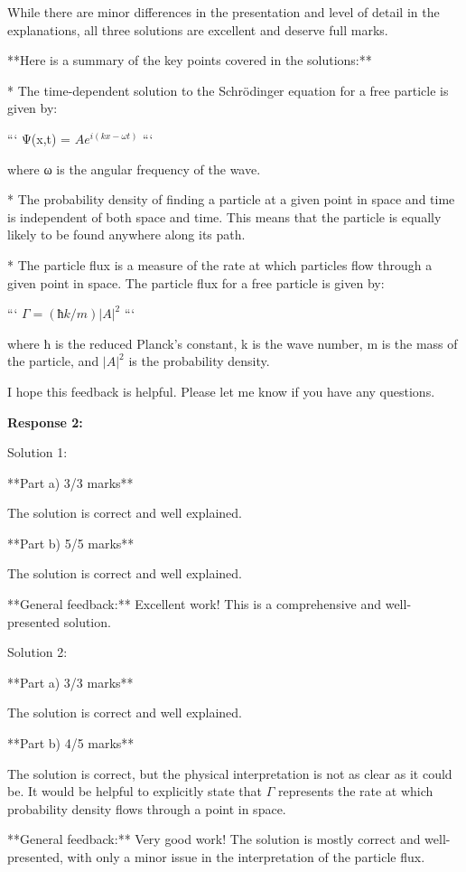 \documentclass[a4paper,11pt]{article}
\begin{document}
While there are minor differences in the presentation and level of detail in the explanations, all three solutions are excellent and deserve full marks.

**Here is a summary of the key points covered in the solutions:**

*   The time-dependent solution to the Schrödinger equation for a free particle is given by:
    
    ```
    Ψ(x,t) = $Ae^{i(kx - ωt)}$
    ```
    
    where ω is the angular frequency of the wave.
    
*   The probability density of finding a particle at a given point in space and time is independent of both space and time. This means that the particle is equally likely to be found anywhere along its path.
    
*   The particle flux is a measure of the rate at which particles flow through a given point in space. The particle flux for a free particle is given by:
    
    ```
    $Γ = (ħk/m)|A|^2$
    ```
    
    where ħ is the reduced Planck's constant, k is the wave number, m is the mass of the particle, and $|A|^2$ is the probability density.
    

I hope this feedback is helpful. Please let me know if you have any questions.

\bigskip    
\textbf{Response 2:}

Solution 1:

**Part a) 3/3 marks** 

The solution is correct and well explained.

**Part b) 5/5 marks** 

The solution is correct and well explained.

**General feedback:** Excellent work! This is a comprehensive and well-presented solution.

Solution 2:

**Part a) 3/3 marks**

The solution is correct and well explained.

**Part b) 4/5 marks**

The solution is correct, but the physical interpretation is not as clear as it could be. It would be helpful to explicitly state that \( \Gamma \) represents the rate at which probability density flows through a point in space.

**General feedback:** Very good work! The solution is mostly correct and well-presented, with only a minor issue in the interpretation of the particle flux.
\end{document}
